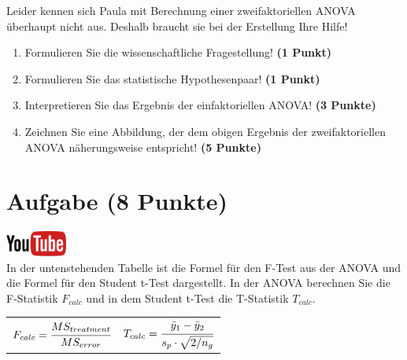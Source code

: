 \documentclass[a4paper, 9pt]{scrartcl}\usepackage[]{graphicx}\usepackage[]{xcolor}
\begin{document}
\vspace{1ex}

Leider kennen sich Paula mit Berechnung einer zweifaktoriellen ANOVA überhaupt nicht aus. Deshalb braucht sie bei der Erstellung Ihre Hilfe! 

\begin{enumerate}
  \item Formulieren Sie die wissenschaftliche Fragestellung! \textbf{(1 Punkt)}
  \item Formulieren Sie das statistische Hypothesenpaar! \textbf{(1 Punkt)}
\item Interpretieren Sie das Ergebnis der einfaktoriellen ANOVA! \textbf{(3 Punkte)} 
\item Zeichnen Sie eine Abbildung, der dem obigen Ergebnis der
  zweifaktoriellen ANOVA näherungsweise entspricht! \textbf{(5 Punkte)}
\end{enumerate}
 
\clearpage

\section{Aufgabe \hfill (8 Punkte)}


\hfill\href{https://youtu.be/FjjJXkFJfIY}{\includegraphics[width =
  2cm]{img/youtube}}\\[1Ex]


In der untenstehenden Tabelle ist die Formel f{\"u}r den F-Test aus der ANOVA
und die Formel f{\"u}r den Student t-Test dargestellt. In der ANOVA berechnen
Sie die F-Statistik $F_{calc}$ und in dem Student t-Test die T-Statistik
$T_{calc}$.

\begin{center}
  \begin{tabular}{cc}
    $F_{calc} = \cfrac{MS_{treatment}}{MS_{error}}$ & $T_{calc} = \cfrac{\bar{y}_1 - \bar{y}_2}{s_p \cdot \sqrt{2/n_g}}$\\
  \end{tabular}
\end{center}
\end{document}
